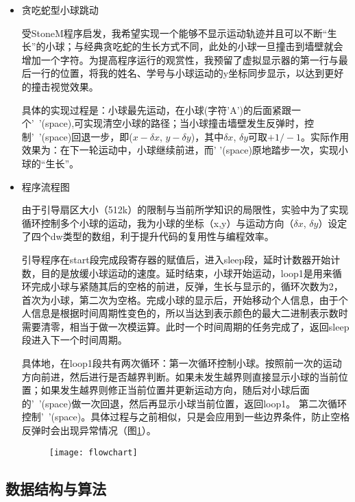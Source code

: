 \documentclass[a4paper,11pt,UTF8]{ctexart}
\newcommand{\bottomcaption}{%
\setlength{\abovecaptionskip}{6pt}%
\setlength{\belowcaptionskip}{6pt}%
\caption}
\newcommand{\xiaowuhao}{\fontsize{9pt}{\baselineskip}\selectfont}   %
\begin{document}
	\begin{itemize}
	\item 贪吃蛇型小球跳动
	
	受StoneM程序启发，我希望实现一个能够不显示运动轨迹并且可以不断“生长”的小球；与经典贪吃蛇的生长方式不同，此处的小球一旦撞击到墙壁就会增加一个字符。为提高程序运行的观赏性，我预留了虚拟显示器的第一行与最后一行的位置，将我的姓名、学号与小球运动的y坐标同步显示，以达到更好的撞击视觉效果。
	
	具体的实现过程是：小球最先运动，在小球(字符'A')的后面紧跟一个'\ '(space),可实现清空小球的路径；当小球撞击墙壁发生反弹时，控制'\ '(space)回退一步，即($x-\delta x$, $y-\delta y$)，其中$\delta x$, $\delta y$可取$+1/-1$。实际作用效果为：在下一轮运动中，小球继续前进，而' '(space)原地踏步一次，实现小球的“生长”。

	\item 程序流程图
	
	由于引导扇区大小（512k）的限制与当前所学知识的局限性，实验中为了实现循环控制多个小球的运动，我为小球的坐标（x,y）与运动方向（$\delta x$, $\delta y$）设定了四个dw类型的数组，利于提升代码的复用性与编程效率。
	
	引导程序在start段完成段寄存器的赋值后，进入sleep段，延时计数器开始计数，目的是放缓小球运动的速度。延时结束，小球开始运动，loop1是用来循环完成小球与紧随其后的空格的前进，反弹，生长与显示的，循环次数为2，首次为小球，第二次为空格。完成小球的显示后，开始移动个人信息，由于个人信息是根据时间周期性变色的，所以当达到表示颜色的最大二进制表示数时需要清零，相当于做一次模运算。此时一个时间周期的任务完成了，返回sleep段进入下一个时间周期。
	
	具体地，在loop1段共有两次循环：第一次循环控制小球。按照前一次的运动方向前进，然后进行是否越界判断。如果未发生越界则直接显示小球的当前位置；如果发生越界则修正当前位置并更新运动方向，随后对小球后面的'\ '(space)做一次回退，然后再显示小球当前位置，返回loop1。
	第二次循环控制'\ '(space)。具体过程与之前相似，只是会应用到一些边界条件，防止空格反弹时会出现异常情况（图\ref{fig1}）。
	
	
	\begin{figure}[htbp]
		\centering
		\texttt{[image: flowchart]}
		\bottomcaption{\xiaowuhao{程序流程图：左图是整体程序的框架，右图是框架中loop1段的具体执行过程}}
		\label{fig1}
	\end{figure}
	
\end{itemize}
	
\subsection{数据结构与算法}
\end{document}
